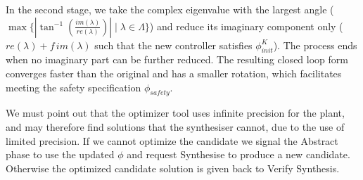 \documentclass[sigconf]{llncs}
\begin{document}
In the second stage, we take the complex eigenvalue
with the largest angle ($\max\{|\tan^{-1}\left(\frac{im(\lambda)}{re(\lambda)}\right)| \mid \lambda \in \Lambda\}$)
and reduce its imaginary component only  ($re(\lambda) + f\, im(\lambda)$ such that the new controller satisfies $\phi_\mathit{init}^K$).
The process ends when no imaginary part can be further reduced.
The resulting closed loop form converges faster than the original and has a
smaller rotation, which facilitates meeting the safety specification $\phi_\mathit{safety}$.

We must point out that the optimizer tool uses infinite precision for the plant, and
may therefore find solutions that the synthesiser cannot, due to the use of limited precision.
If we cannot optimize the candidate  we signal the {\sc Abstract} phase to 
use the updated $\phi$ and request {\sc Synthesise} to produce a new
candidate.  Otherwise the optimized candidate solution is given back to
{\sc Verify Synthesis}.
\end{document}
